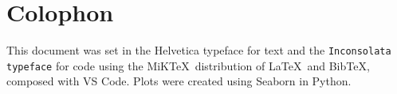 \chapter{Colophon}
\label{appendix:colophon}

This document was set in the \textsf{Helvetica typeface} for text and the
\texttt{Inconsolata typeface} for code using the MiK\TeX\ distribution of
\LaTeX\ and Bib\TeX, composed with VS Code. Plots were created using Seaborn in 
Python.